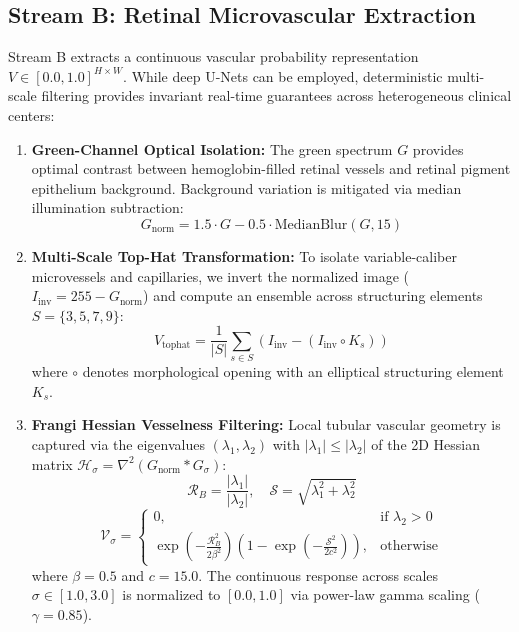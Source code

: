 \documentclass[conference]{IEEEtran}
\begin{document}
\subsection{Stream B: Retinal Microvascular Extraction}
Stream B extracts a continuous vascular probability representation $V \in [0.0, 1.0]^{H \times W}$. While deep U-Nets can be employed, deterministic multi-scale filtering provides invariant real-time guarantees across heterogeneous clinical centers:
\begin{enumerate}
    \item \textbf{Green-Channel Optical Isolation:} The green spectrum $G$ provides optimal contrast between hemoglobin-filled retinal vessels and retinal pigment epithelium background. Background variation is mitigated via median illumination subtraction:
    \begin{equation}
        G_{\text{norm}} = 1.5 \cdot G - 0.5 \cdot \text{MedianBlur}(G, 15)
    \end{equation}
    \item \textbf{Multi-Scale Top-Hat Transformation:} To isolate variable-caliber microvessels and capillaries, we invert the normalized image ($I_{\text{inv}} = 255 - G_{\text{norm}}$) and compute an ensemble across structuring elements $S = \{3, 5, 7, 9\}$:
    \begin{equation}
        V_{\text{tophat}} = \frac{1}{|S|} \sum_{s \in S} \left( I_{\text{inv}} - \left( I_{\text{inv}} \circ K_s \right) \right)
    \end{equation}
    where $\circ$ denotes morphological opening with an elliptical structuring element $K_s$.
    \item \textbf{Frangi Hessian Vesselness Filtering:} Local tubular vascular geometry is captured via the eigenvalues $(\lambda_1, \lambda_2)$ with $|\lambda_1| \le |\lambda_2|$ of the 2D Hessian matrix $\mathcal{H}_\sigma = \nabla^2 \left( G_{\text{norm}} * G_\sigma \right)$:
    \begin{equation}
        \mathcal{R}_B = \frac{|\lambda_1|}{|\lambda_2|}, \quad \mathcal{S} = \sqrt{\lambda_1^2 + \lambda_2^2}
    \end{equation}
    \begin{equation}
        \mathcal{V}_\sigma = \begin{cases} 0, & \text{if } \lambda_2 > 0 \\ \exp\left( -\frac{\mathcal{R}_B^2}{2\beta^2} \right) \left( 1 - \exp\left( -\frac{\mathcal{S}^2}{2c^2} \right) \right), & \text{otherwise} \end{cases}
    \end{equation}
    where $\beta = 0.5$ and $c = 15.0$. The continuous response across scales $\sigma \in [1.0, 3.0]$ is normalized to $[0.0, 1.0]$ via power-law gamma scaling ($\gamma = 0.85$).
\end{enumerate}
\end{document}
